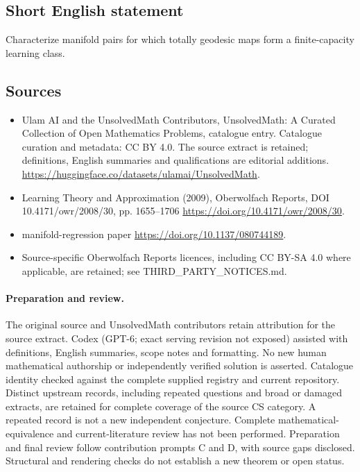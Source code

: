 \documentclass[11pt]{article}
\begin{document}
\subsection{Short English statement}
Characterize manifold pairs for which totally geodesic maps form a finite-capacity learning class.
\subsection{Sources}
\begin{itemize}
\item[\hypertarget{source:statement:1}{S1}] Ulam AI and the UnsolvedMath Contributors, UnsolvedMath: A Curated Collection of Open Mathematics Problems, catalogue entry. Catalogue curation and metadata: CC BY 4.0. The source extract is retained; definitions, English summaries and qualifications are editorial additions.
\url{https://huggingface.co/datasets/ulamai/UnsolvedMath}.
\item[\hypertarget{source:statement:2}{S2}] Learning Theory and Approximation (2009), Oberwolfach Reports, DOI 10.4171/owr/2008/30, pp. 1655--1706
\url{https://doi.org/10.4171/owr/2008/30}.
\item[\hypertarget{source:statement:3}{S3}] manifold-regression paper
\url{https://doi.org/10.1137/080744189}.
\item Source-specific Oberwolfach Reports licences, including CC BY-SA 4.0 where applicable, are retained; see THIRD\_PARTY\_NOTICES.md.
\end{itemize}
\paragraph{Preparation and review.}
The original source and UnsolvedMath contributors retain attribution for the source extract. Codex (GPT-6; exact serving revision not exposed) assisted with definitions, English summaries, scope notes and formatting. No new human mathematical authorship or independently verified solution is asserted. Catalogue identity checked against the complete supplied registry and current repository. Distinct upstream records, including repeated questions and broad or damaged extracts, are retained for complete coverage of the source CS category. A repeated record is not a new independent conjecture. Complete mathematical-equivalence and current-literature review has not been performed. Preparation and final review follow contribution prompts C and D, with source gaps disclosed. Structural and rendering checks do not establish a new theorem or open status.
\label{end:statement}
\end{document}
